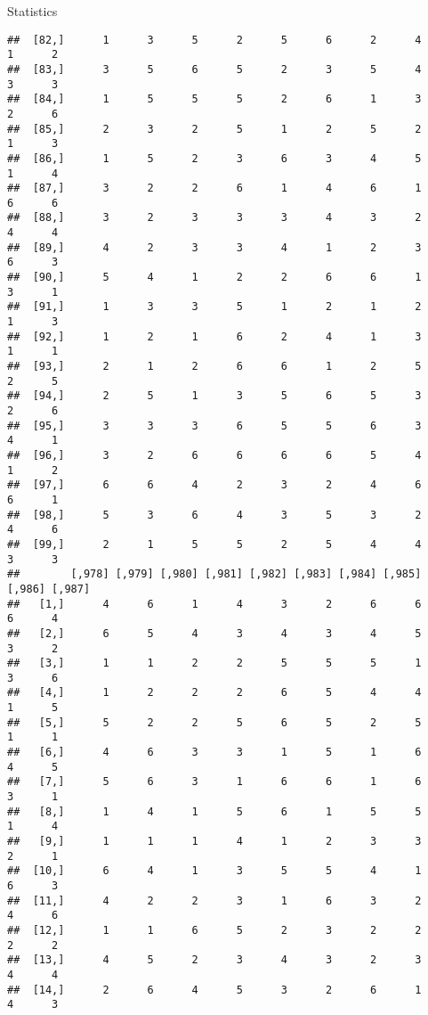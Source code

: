 \documentclass[
  ignorenonframetext,
]{beamer}
\begin{document}
\begin{frame}[fragile]{Statistics}
\begin{verbatim}
##  [82,]      1      3      5      2      5      6      2      4      1      2
##  [83,]      3      5      6      5      2      3      5      4      3      3
##  [84,]      1      5      5      5      2      6      1      3      2      6
##  [85,]      2      3      2      5      1      2      5      2      1      3
##  [86,]      1      5      2      3      6      3      4      5      1      4
##  [87,]      3      2      2      6      1      4      6      1      6      6
##  [88,]      3      2      3      3      3      4      3      2      4      4
##  [89,]      4      2      3      3      4      1      2      3      6      3
##  [90,]      5      4      1      2      2      6      6      1      3      1
##  [91,]      1      3      3      5      1      2      1      2      1      3
##  [92,]      1      2      1      6      2      4      1      3      1      1
##  [93,]      2      1      2      6      6      1      2      5      2      5
##  [94,]      2      5      1      3      5      6      5      3      2      6
##  [95,]      3      3      3      6      5      5      6      3      4      1
##  [96,]      3      2      6      6      6      6      5      4      1      2
##  [97,]      6      6      4      2      3      2      4      6      6      1
##  [98,]      5      3      6      4      3      5      3      2      4      6
##  [99,]      2      1      5      5      2      5      4      4      3      3
##        [,978] [,979] [,980] [,981] [,982] [,983] [,984] [,985] [,986] [,987]
##   [1,]      4      6      1      4      3      2      6      6      6      4
##   [2,]      6      5      4      3      4      3      4      5      3      2
##   [3,]      1      1      2      2      5      5      5      1      3      6
##   [4,]      1      2      2      2      6      5      4      4      1      5
##   [5,]      5      2      2      5      6      5      2      5      1      1
##   [6,]      4      6      3      3      1      5      1      6      4      5
##   [7,]      5      6      3      1      6      6      1      6      3      1
##   [8,]      1      4      1      5      6      1      5      5      1      4
##   [9,]      1      1      1      4      1      2      3      3      2      1
##  [10,]      6      4      1      3      5      5      4      1      6      3
##  [11,]      4      2      2      3      1      6      3      2      4      6
##  [12,]      1      1      6      5      2      3      2      2      2      2
##  [13,]      4      5      2      3      4      3      2      3      4      4
##  [14,]      2      6      4      5      3      2      6      1      4      3

\end{verbatim}
\end{frame}
\end{document}
